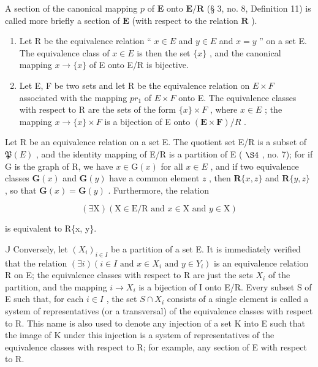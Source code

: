 A section of the canonical mapping \(p\) of \(\mathbf{E}\) onto \(\mathbf{E} / \mathbf{R}\) (§ 3, no. 8, Definition 11) is called more briefly a section of \(\mathbf{E}\) (with respect to the relation \(\mathbf{R}\) ).


\begin{enumerate}
\def\labelenumi{(\arabic{enumi})}
\item
  Let R be the equivalence relation `` \(x \in E\) and \(y \in E\) and \(x = y\) '' on a set E. The equivalence class of \(x \in E\) is then the set \(\{x\}\) , and the canonical mapping \(x \to \{x\}\) of E onto E/R is bijective.
\item
  Let E, F be two sets and let R be the equivalence relation on \(E \times F\) associated with the mapping \(pr_{1}\) of \(E \times F\) onto E. The equivalence classes with respect to R are the sets of the form \(\{x\} \times F\) , where \(x \in E\) ; the mapping \(x \to \{x\} \times F\) is a bijection of E onto \((\mathbf{E} \times \mathbf{F}) / R\) .
\end{enumerate}

Let R be an equivalence relation on a set E. The quotient set E/R is a subset of \(\mathfrak{P}(E)\) , and the identity mapping of E/R is a partition of E ( \(\S4\) , no. 7); for if G is the graph of R, we have \(x \in \mathrm{G}(x)\) for all \(x \in E\) , and if two equivalence classes \(\mathbf{G}(x)\) and \(\mathbf{G}(y)\) have a common element \(z\) , then \(\mathbf{R}\{x, z\}\) and \(\mathbf{R}\{y, z\}\) , so that \(\mathbf{G}(x) = \mathbf{G}(y)\) . Furthermore, the relation

\[
(\exists \mathrm{X}) (\mathrm{X} \in \mathrm{E} / \mathrm{R} \text { and } x \in \mathrm{X} \text { and } y \in \mathrm{X})
\]

is equivalent to R\{x, y\}.

\(\mathbb{J}\) Conversely, let \((X_{i})_{i\in I}\) be a partition of a set E. It is immediately verified that the relation \((\exists i)(i\in I \text{ and } x\in X_{i} \text{ and } y\in Y_{i})\) is an equivalence relation R on E; the equivalence classes with respect to R are just the sets \(X_{i}\) of the partition, and the mapping \(i\to X_{i}\) is a bijection of I onto E/R. Every subset S of E such that, for each \(i\in I\) , the set \(S\cap X_{i}\) consists of a single element is called a system of representatives (or a transversal) of the equivalence classes with respect to R. This name is also used to denote any injection of a set K into E such that the image of K under this injection is a system of representatives of the equivalence classes with respect to R; for example, any section of E with respect to R.

